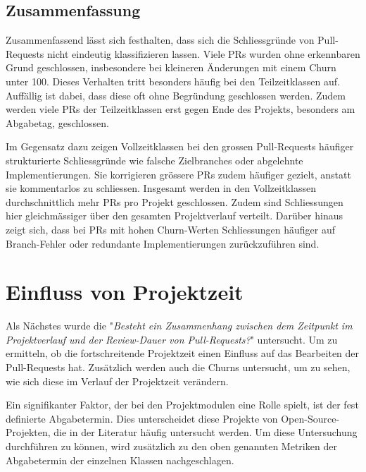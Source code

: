 \subsection{Zusammenfassung}

Zusammenfassend lässt sich festhalten, dass sich die Schliessgründe von Pull-\linebreak Requests nicht eindeutig klassifizieren lassen. Viele PRs wurden ohne erkennbaren Grund geschlossen, insbesondere bei kleineren Änderungen mit einem Churn unter 100. Dieses Verhalten tritt besonders häufig bei den Teilzeitklassen auf. Auffällig ist dabei, dass diese oft ohne Begründung geschlossen werden. Zudem werden viele PRs der Teilzeitklassen erst gegen Ende des Projekts, besonders am Abgabetag, geschlossen.

Im Gegensatz dazu zeigen Vollzeitklassen bei den grossen Pull-Requests häufiger strukturierte Schliessgründe wie falsche Zielbranches oder abgelehnte Implementierungen. Sie korrigieren grössere PRs zudem häufiger gezielt, anstatt sie kommentarlos zu schliessen. Insgesamt werden in den Vollzeitklassen durchschnittlich mehr PRs pro Projekt geschlossen. Zudem sind Schliessungen hier gleichmässiger über den gesamten Projektverlauf verteilt. Darüber hinaus zeigt sich, dass bei PRs mit hohen Churn-Werten Schliessungen häufiger auf Branch-Fehler oder redundante Implementierungen zurückzuführen sind.

\section{Einfluss von Projektzeit}
Als Nächstes wurde die  "\textit{Besteht ein Zusammenhang zwischen dem Zeitpunkt im Projektverlauf und der Review-Dauer von Pull-Requests?}" untersucht. Um zu ermitteln, ob die fortschreitende Projektzeit einen Einfluss auf das Bearbeiten der Pull-Requests hat. Zusätzlich werden auch die Churns untersucht, um zu sehen, wie sich diese im Verlauf der Projektzeit verändern. 


Ein signifikanter Faktor, der bei den Projektmodulen eine Rolle spielt, ist der fest definierte Abgabetermin. Dies unterscheidet diese Projekte von Open-Source-Projek\-ten, die in der Literatur häufig untersucht werden. Um diese Untersuchung durchführen zu können, wird zusätzlich zu den oben genannten Metriken der Abgabetermin der einzelnen Klassen nachgeschlagen.

